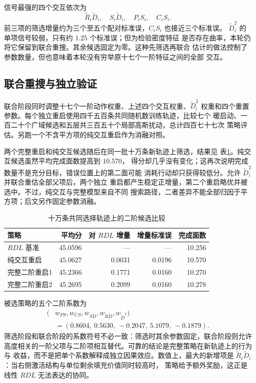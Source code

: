\documentclass[UTF8,11pt,openany]{ctexrep}
\begin{document}
信号最强的四个交互依次为
\[
\widetilde R_i\widetilde D_i,\quad
S_i\widetilde D_i,\quad
P_iS_i,\quad C_iS_i.
\]
前三项的筛选增量约为三个至五个配对标准误，$C_iS_i$ 也接近三个标准误。
$\widetilde D_i^2$ 的单项信号较弱，只有约 $1.25$ 个标准误；但为检验密度特征
是否存在曲率，本轮仍将它保留到联合重搜。其余候选固定为零。这种先筛选再联合
估计的做法控制了参数数量，但也意味着本轮没有穷举原十七个一阶特征之间的全部
交互。

\subsection{联合重搜与独立验证}

联合阶段同时调整十七个一阶动作权重、上述四个交互权重、$\widetilde D_i^2$
权重和四个重置参数。每个独立重启使用四千五百条共同随机数训练轨迹，比较七个
暖启动、一百二十个广域候选和五层共三百五十个局部高斯扰动，总计四百七十七次
策略评估。另跑一个不含平方项的纯交互重启作为消融对照。

两个完整重启和纯交互候选随后在同一批十万条新轨迹上筛选，结果见
表\ref{tab:second-order-selection}。纯交互候选虽然平均完成面数提高到 $10.570$，
得分却几乎没有变化；这再次说明完成数量不是充分目标，错误位置上的第二面可能
消耗行动却只获得较低分。允许 $\widetilde D_i^2$ 并联合重估全部父项后，两个独立
重启都产生稳定正增量，第二个重启略优并被选中。不过，纯交互与完整模型来自不同
搜索路径，二者差异不能全部归因于平方项；后文另作固定参数消融。

\begin{table}[htbp]
\centering
\caption{十万条共同选择轨迹上的二阶候选比较}
\label{tab:second-order-selection}
\begin{tabular}{lrrrr}
\toprule
策略 & 平均分 & 对 $RDL$ 增量 & 增量标准误 & 完成面数 \\
\midrule
$RDL$ 基准 & 45.0596 & --- & --- & 10.256 \\
纯交互重启 & 45.0627 & 0.0031 & 0.0196 & 10.570 \\
完整二阶重启1 & 45.2366 & 0.1771 & 0.0160 & 10.270 \\
完整二阶重启2 & 45.2695 & 0.2099 & 0.0160 & 10.278 \\
\bottomrule
\end{tabular}
\end{table}

被选策略的五个二阶系数为
\[
\begin{aligned}
(&w_{PS},w_{CS},w_{S\widetilde D},
w_{\widetilde R\widetilde D},w_{\widetilde D^2})\\
&=(0.8604,\ 0.5630,\ -0.2047,\ 5.1079,\ -0.1879).
\end{aligned}
\]
筛选阶段和联合阶段的系数符号不必一致：筛选时其余参数固定，联合阶段则允许
高度相关的一阶父项与二阶项相互替代。可靠的结论是完整策略在新轨迹上的行为与
收益，而不是把单个系数解释成独立因果效应。数值上，最大的新增项是
$\widetilde R_i\widetilde D_i$：当右侧激活结构与单位剩余填充价值同时较高时，
策略给予额外奖励，这正是线性 $RDL$ 无法表达的协同。
\end{document}
